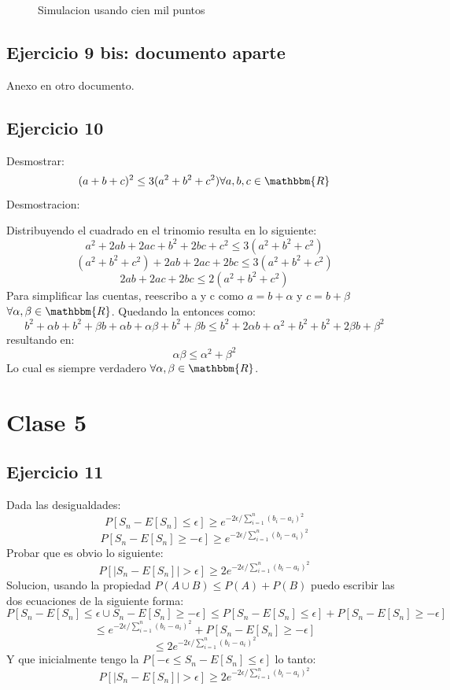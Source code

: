 \documentclass[12pt, a4paper]{article}
\begin{document}
\begin{figure}[H]
\begin{minipage}[b]{.3\linewidth}
		\label{fig:cien_mil_13}
	\end{minipage}
	\caption{Simulacion usando cien mil puntos}\label{fig:cien_mil}
\end{figure}

\subsection{Ejercicio 9 bis: documento aparte}
	Anexo en otro documento.
\subsection{Ejercicio 10}

Desmostrar:
		$$(a+b+c)^2 \leq 3(a^2+b^2+c^2) \forall a,b,c \in \mathbbm{R}$$
Desmostracion:

Distribuyendo el cuadrado en el trinomio resulta en lo siguiente:
		$$a^2+2ab+2ac+b^2+2bc+c^2 \leq 3(a^2+b^2+c^2)$$
		$$(a^2+b^2+c^2)+2ab+2ac+2bc \leq 3(a^2+b^2+c^2)$$
		$$2ab+2ac+2bc \leq 2(a^2+b^2+c^2)$$
Para simplificar las cuentas, reescribo a y c como $a = b+\alpha$ y $c = b+\beta$  $\forall \alpha, \beta \in \mathbbm{R}$. Quedando la entonces como:
		$$b^2+\alpha b+b^2+\beta b+\alpha b+\alpha \beta+b^2+\beta b \leq b^2+2\alpha b+\alpha^2+b^2+b^2+2\beta b+\beta^2$$
resultando en:
		$$\alpha \beta \leq \alpha^2+\beta^2$$
Lo cual es siempre verdadero $\forall \alpha,\beta \in \mathbbm{R}$.

\section{Clase 5}
\subsection{Ejercicio 11}
Dada las desigualdades:
		$$P[S_n - E[S_n] \leq \epsilon ] \geq e^{-2\epsilon/\sum\limits_{i=1}^{n}(b_i-a_i)^2}$$
		$$P[S_n - E[S_n] \geq -\epsilon ] \geq e^{-2\epsilon/\sum\limits_{i=1}^{n}(b_i-a_i)^2}$$
Probar que es obvio lo siguiente:
		$$P[|S_n - E[S_n]| > \epsilon ] \geq 2 e^{-2\epsilon/\sum\limits_{i=1}^{n}(b_i-a_i)^2}$$
Solucion, usando la propiedad $P(A\cup B) \leq P(A) + P(B)$ puedo escribir las dos ecuaciones de la siguiente forma:
		$$P[S_n - E[S_n] \leq \epsilon \cup S_n - E[S_n] \geq -\epsilon ] \leq P[S_n - E[S_n] \leq \epsilon ] + P[S_n - E[S_n] \geq -\epsilon ]$$
		$$\leq e^{-2\epsilon/\sum\limits_{i=1}^{n}(b_i-a_i)^2} + P[S_n - E[S_n] \geq -\epsilon ]$$
		$$\leq 2 e^{-2\epsilon/\sum\limits_{i=1}^{n}(b_i-a_i)^2}$$
Y que inicialmente tengo la $P[-\epsilon \leq S_n - E[S_n] \leq \epsilon ]$ lo tanto:
		$$P[|S_n - E[S_n]| > \epsilon ] \geq 2 e^{-2\epsilon/\sum\limits_{i=1}^{n}(b_i-a_i)^2}$$
\end{document}
